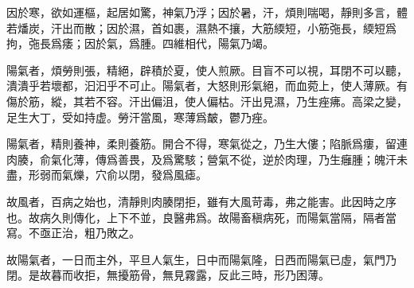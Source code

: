 \documentclass[draft,12pt]{ctexbook}
\begin{document}

\begin{yuanwen}
因於寒，欲如運樞，起居如驚，神氣乃浮；因於暑，汗，煩則喘喝，靜則多言，體若燔炭，汗出而散；因於濕，首如裹，濕熱不攘，大筋緛短，小筋㢮長，緛短爲拘，㢮長爲痿；因於氣，爲腫。四維相代，陽氣乃竭。

陽氣者，煩勞則張，精絕，辟積於夏，使人煎厥。目盲不可以視，耳閉不可以聽，潰潰乎若壞都，汩汩乎不可止。陽氣者，大怒則形氣絕，而血菀上，使人薄厥。有傷於筋，縱，其若不容。汗出偏沮，使人偏枯。汗出見濕，乃生痤疿。高梁之變，足生大丁，受如持虚。勞汗當風，寒薄爲皶，鬱乃痤。

陽氣者，精則養神，柔則養筋。開合不得，寒氣從之，乃生大僂；陷脈爲瘻，留連肉腠，俞氣化薄，傳爲善畏，及爲驚駭；營氣不從，逆於肉理，乃生癰腫；魄汗未盡，形弱而氣爍，穴俞以閉，發爲風瘧。

故風者，百病之始也，清靜則肉腠閉拒，雖有大風苛毒，弗之能害。此因時之序也。故病久則傳化，上下不並，良醫弗爲。故陽畜稹病死，而陽氣當隔，隔者當寫。不亟正治，粗乃敗之。

故陽氣者，一日而主外，平旦人氣生，日中而陽氣隆，日西而陽氣已虛，氣門乃閉。是故暮而收拒，無擾筋骨，無見霧露，反此三時，形乃困薄。
\end{yuanwen}

\end{document}
